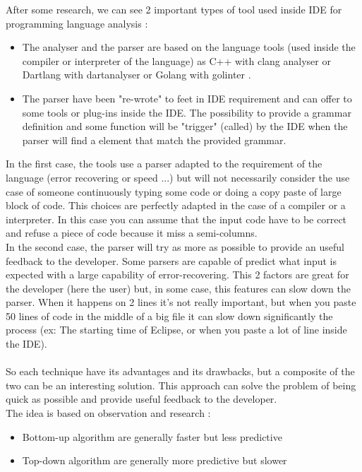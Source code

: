 After some research, we can see 2 important types of tool used inside IDE for programming language analysis :
\begin{itemize}
\item The analyser and the parser are based on the language tools (used inside the compiler or interpreter of the language) as C++ with clang analyser \cite{Clang5:online} or Dartlang with dartanalyser\cite{darta0:online} or Golang with golinter \cite{golan5:online}.
\item The parser have been "re-wrote" to feet in IDE requirement and can offer to some tools or plug-ins inside the IDE. The possibility to provide a grammar definition and some function will be "trigger" (called) by the IDE when the parser will find a element that match the provided grammar.
\end{itemize}
In the first case, the tools use a parser adapted to the requirement of the language (error recovering or speed ...) but will not necessarily consider the use case of someone continuously typing some code or doing a copy \/ paste of large block of code. This choices are perfectly adapted in the case of a compiler or a interpreter. In this case you can assume that the input code have to be correct and refuse a piece of code because it miss a semi-columns.
\\
In the second case, the parser will try as more as possible to provide an useful feedback to the developer. Some parsers are capable of predict what input is expected with a large capability of error-recovering. This 2 factors are great for the developer (here the user) but, in some case, this features can slow down the parser. When it happens on 2 lines it's not really important, but when you paste 50 lines of code in the middle of a big file it can slow down significantly the process (ex: The starting time of Eclipse, or when you paste a lot of line inside the IDE).
\\
\\
So each technique have its advantages and its drawbacks, but a composite of the two can be an interesting solution. This approach can solve the problem of being quick as possible and provide useful feedback to the developer.
\\
The idea is based on observation and research :
\begin{itemize}
\item Bottom-up algorithm are generally faster but less predictive
\item Top-down algorithm are generally more predictive but slower
\end{itemize}

